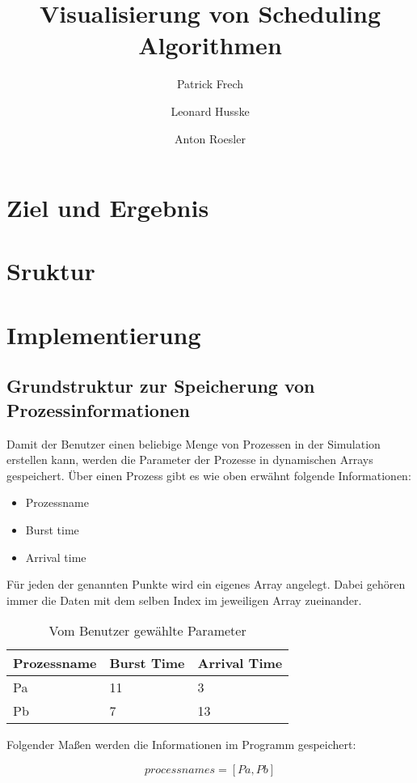 \documentclass[runningheads]{llncs}
\title {Visualisierung von Scheduling Algorithmen}
\author{Patrick Frech \and
Leonard Husske\and
Anton Roesler}
\institute {Frankfurt University of Applied Sciences}
\begin{document}
\maketitle

%
\section{Ziel und Ergebnis}
\section{Sruktur}
\section{Implementierung}
\subsection{Grundstruktur zur Speicherung von Prozessinformationen}
Damit der Benutzer einen beliebige Menge von Prozessen in der Simulation erstellen kann, werden die Parameter der Prozesse in dynamischen Arrays gespeichert. Über einen Prozess gibt es wie oben erwähnt folgende Informationen: 

\begin{itemize}
\item Prozessname 
\item Burst time
\item Arrival time
\end{itemize}

Für jeden der genannten Punkte wird ein eigenes Array angelegt. Dabei gehören immer die Daten mit dem selben Index im jeweiligen Array zueinander. 




\begin{table}
\caption{Vom Benutzer gewählte Parameter}\label{tab1}
\begin{tabular}{|l|l|l|}
\hline
Prozessname &  Burst Time & Arrival Time\\
\hline
Pa &  11 & 3\\
Pb & 7 & 13\\
\hline
\end{tabular}
\end{table}




\noindent Folgender Maßen werden die Informationen im Programm gespeichert:

\begin{equation}
process names = [ Pa, Pb ] 
\end{equation}
\end{document}
